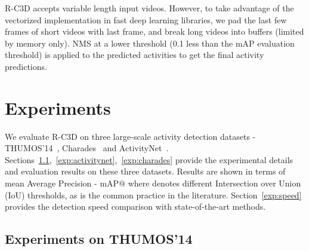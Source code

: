 \documentclass[10pt,twocolumn,letterpaper]{article}
\newcommand{\modelname}[0]{R-C3D }
\begin{document}
\modelname accepts variable length input videos.
However, to take advantage of the vectorized implementation in fast deep learning libraries, we pad the last few frames of short videos with last frame, and break long videos into buffers (limited by memory only).
NMS at a lower threshold (0.1 less than the mAP evaluation threshold) is applied to the predicted activities to get the final activity predictions.
 \section{Experiments}
We evaluate \modelname on three large-scale activity detection datasets - THUMOS'14~\cite{THUMOS14}, Charades~\cite{sigurdsson2016hollywood} and ActivityNet~\cite{caba2015activitynet}.
Sections~\ref{exp:thumos14},~\ref{exp:activitynet},~\ref{exp:charades} provide the experimental details and evaluation results on these three datasets.
Results are shown in terms of mean Average Precision - mAP@ where  denotes different Intersection over Union (IoU) thresholds, as is the common practice in the literature.
Section~\ref{exp:speed} provides the detection speed comparison with state-of-the-art methods.

\subsection{Experiments on THUMOS'14}
\label{exp:thumos14}
\end{document}

